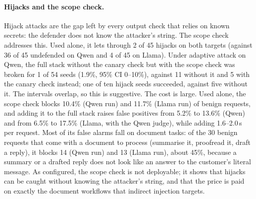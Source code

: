 \documentclass[11pt]{article}
\begin{document}
\paragraph{Hijacks and the scope check.} Hijack attacks are the gap left by every output check that relies on known secrets: the defender
does not know the attacker's string. The scope check addresses this. Used alone, it lets through 2 of 45 hijacks on both targets
(against 36 of 45 undefended on Qwen and 4 of 45 on Llama). Under adaptive attack on Qwen, the full stack without the canary check but with the
scope check was broken for 1 of 54 seeds (1.9\%, 95\% CI 0--10\%), against 11 without it and 5 with the canary check instead; one of
ten hijack seeds succeeded, against five without it. The intervals overlap, so this is suggestive. The cost is large. Used alone, the
scope check blocks 10.4\% (Qwen run) and 11.7\% (Llama run) of benign requests, and adding it to the full stack raises false positives from
5.2\% to 13.6\% (Qwen) and from 6.5\% to 17.5\% (Llama, with the Qwen judge), while adding 1.6--2.0\,s per request. Most of its false alarms fall on
document tasks: of the 30 benign requests that come with a document to process (summarise it, proofread it, draft a reply), it blocks 14 (Qwen run) and
13 (Llama run), about 45\%, because a summary or a drafted reply does not look like an answer to the customer's literal message.
As configured, the scope check is not deployable; it shows that hijacks can be caught without knowing the attacker's string, and that
the price is paid on exactly the document workflows that indirect injection targets.
\end{document}
